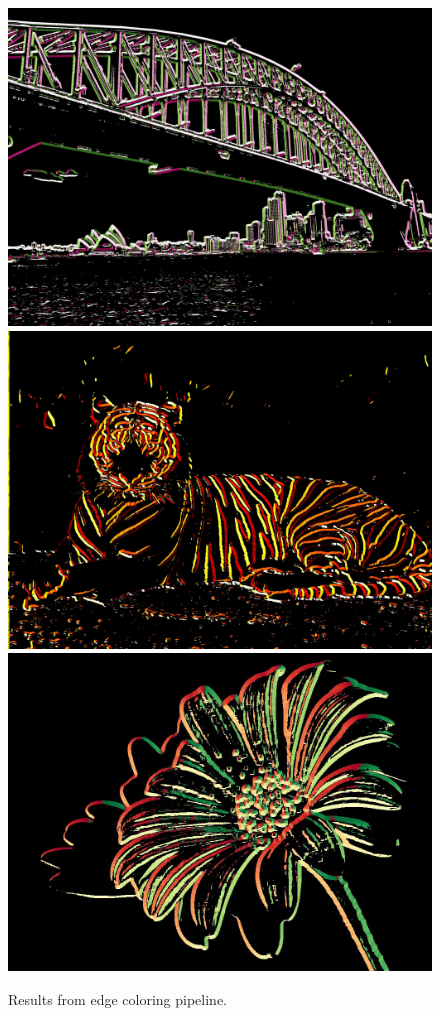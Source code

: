 \documentclass[runningheads]{llncs}
\begin{document}
\begin{figure}[h!]
\centering
\includegraphics[height=5.2 cm]{images/edge_color_3.jpg} \\
\vspace{0.3cm}
\includegraphics[height=5.2 cm]{images/edge_color_2.jpg} \\
\vspace{0.3cm}
\includegraphics[height=5.2 cm]{images/edge_color_4.jpg}
\caption{Results from edge coloring pipeline.}
\label{fig:example}
\end{figure}

\clearpage




\end{document}
